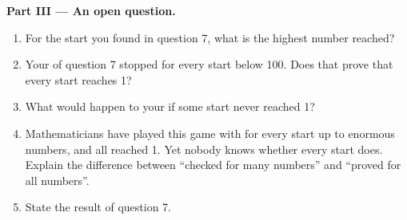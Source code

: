 \begin{problem}
\medskip\noindent\textbf{Part III --- An open question.}
\begin{enumerate}[resume]
  \item For the start you found in question 7, what is the highest number
    reached?
  \item Your  of question 7 stopped for every start below 100. Does
    that prove that every start reaches 1?
  \item What would happen to your  if some start never reached 1?
  \item Mathematicians have played this game with  for every start
    up to enormous numbers, and all reached 1. Yet nobody knows whether every
    start does. Explain the difference between ``checked for many numbers'' and
    ``proved for all numbers''.
  \item State the result of question 7.
\end{enumerate}
\end{problem}
